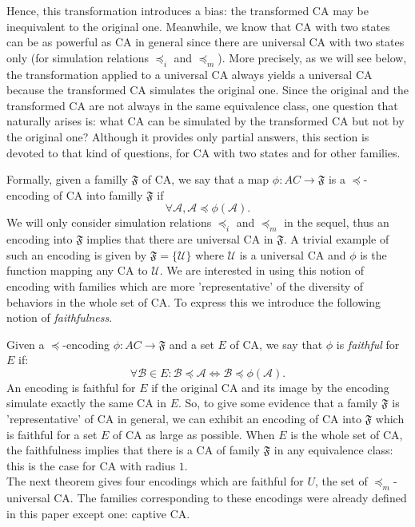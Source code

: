 \documentclass[a4paper]{elsarticle}
\newcommand{\ACA}{\mathcal{A}}
\newcommand{\ACB}{\mathcal{B}}
\newcommand{\ACU}{\mathcal{U}}
\newcommand{\simu}{\preccurlyeq}
\newcommand{\sacsimu}{\simu_i}
\newcommand{\facsacsimu}{\simu_m}
\newcommand\fami{\mathfrak{F}}
\newcommand\cod{\phi}
\begin{document}
Hence, this transformation introduces a bias: the transformed CA may
be inequivalent to the original one. Meanwhile, we know that CA with
two states can be as powerful as CA in general since there are
universal CA with two states only \cite{banks,nicolasFCT} (for
simulation relations $\sacsimu$ and $\facsacsimu$). More precisely, as
we will see below, the transformation applied to a universal CA always
yields a universal CA because the transformed CA simulates the
original one. Since the original and the transformed CA are not always
in the same equivalence class, one question that naturally arises is:
what CA can be simulated by the transformed CA but not by the original
one?  Although it provides only partial answers, this section is
devoted to that kind of questions, for CA with two states and for
other families.

Formally, given a familly $\fami$ of CA, we say that a map
${\cod:AC\rightarrow \fami}$ is a $\simu$-encoding of CA into familly
$\fami$ if
\[\forall\ACA, \ACA\simu\cod(\ACA).\]
We will only consider simulation relations $\sacsimu$ and $\facsacsimu$ in the
sequel, thus an encoding into $\fami$ implies that there are universal CA in
$\fami$. A trivial example of such an encoding is given by ${\fami=\{\ACU\}}$
where $\ACU$ is a universal CA and $\phi$ is the function mapping any CA to
$\ACU$.  We are interested in using this notion of encoding with families which
are more 'representative' of the diversity of behaviors in the whole set of CA.
To express this we introduce the following notion of \emph{faithfulness}.

Given a $\simu$-encoding ${\cod:AC\rightarrow \fami}$ and a set $E$ of
CA, we say that $\cod$ is \emph{faithful} for $E$ if:
\[\forall\ACB\in E: \ACB\simu\ACA\iff\ACB\simu\cod(\ACA).\]
An encoding is faithful for $E$ if the original CA and its image by
the encoding simulate exactly the same CA in $E$. So, to give some
evidence that a family $\fami$ is 'representative' of CA in general,
we can exhibit an encoding of CA into $\fami$ which is faithful for a
set $E$ of CA as large as possible. When $E$ is the whole set of CA,
the faithfulness implies that there is a CA of family $\fami$ in any
equivalence class: this is the case for CA with radius $1$.\\

The next theorem gives four encodings which are faithful for $U$, the
set of $\facsacsimu$-universal CA. The families corresponding to these
encodings were already defined in this paper except one: captive CA.
\end{document}
